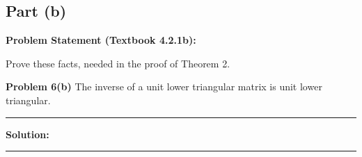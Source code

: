 \clearpage
\subsection*{Part (b)}

\textbf{Problem Statement (Textbook 4.2.1b):} 

Prove these facts, needed in the proof of Theorem 2.

\textbf{Problem 6(b)} The inverse of a unit lower triangular matrix is unit lower triangular.

\noindent\rule{\textwidth}{0.4pt}

\vspace{1em}

\textbf{Solution:}


\vspace{2em}
\noindent\rule{\textwidth}{0.4pt}

